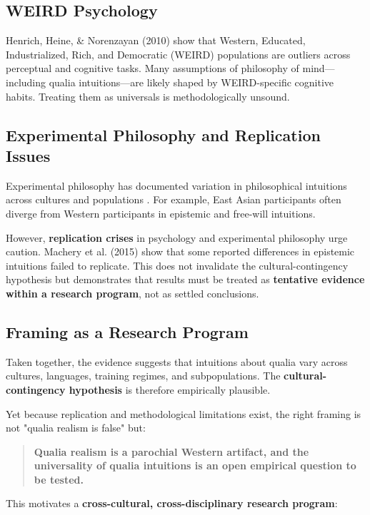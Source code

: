 \documentclass[11pt,a4paper]{article}
\begin{document}
\subsection{WEIRD Psychology}

Henrich, Heine, \& Norenzayan (2010) show that Western, Educated, Industrialized, Rich, and Democratic (WEIRD) populations are outliers across perceptual and cognitive tasks. Many assumptions of philosophy of mind—including qualia intuitions—are likely shaped by WEIRD-specific cognitive habits. Treating them as universals is methodologically unsound.

\subsection{Experimental Philosophy and Replication Issues}

Experimental philosophy has documented variation in philosophical intuitions across cultures and populations \cite{weinberg2001, stich2003}. For example, East Asian participants often diverge from Western participants in epistemic and free-will intuitions.

However, \textbf{replication crises} in psychology and experimental philosophy urge caution. Machery et al. (2015) show that some reported differences in epistemic intuitions failed to replicate. This does not invalidate the cultural-contingency hypothesis but demonstrates that results must be treated as \textbf{tentative evidence within a research program}, not as settled conclusions.

\subsection{Framing as a Research Program}

Taken together, the evidence suggests that intuitions about qualia vary across cultures, languages, training regimes, and subpopulations. The \textbf{cultural-contingency hypothesis} is therefore empirically plausible.

Yet because replication and methodological limitations exist, the right framing is not "qualia realism is false" but:

\begin{quote}
\textbf{Qualia realism is a parochial Western artifact, and the universality of qualia intuitions is an open empirical question to be tested.}
\end{quote}

This motivates a \textbf{cross-cultural, cross-disciplinary research program}:
\end{document}
